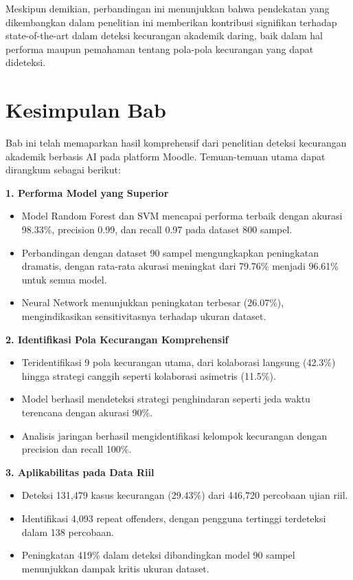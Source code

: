 Meskipun demikian, perbandingan ini menunjukkan bahwa pendekatan yang dikembangkan dalam penelitian ini memberikan kontribusi signifikan terhadap state-of-the-art dalam deteksi kecurangan akademik daring, baik dalam hal performa maupun pemahaman tentang pola-pola kecurangan yang dapat dideteksi.

\section{Kesimpulan Bab}
\label{sec:kesimpulanBab4}

Bab ini telah memaparkan hasil komprehensif dari penelitian deteksi kecurangan akademik berbasis AI pada platform Moodle. Temuan-temuan utama dapat dirangkum sebagai berikut:

\textbf{1. Performa Model yang Superior}
\begin{itemize}
    \item Model Random Forest dan SVM mencapai performa terbaik dengan akurasi 98.33\%, precision 0.99, dan recall 0.97 pada dataset 800 sampel.
    \item Perbandingan dengan dataset 90 sampel mengungkapkan peningkatan dramatis, dengan rata-rata akurasi meningkat dari 79.76\% menjadi 96.61\% untuk semua model.
    \item Neural Network menunjukkan peningkatan terbesar (26.07\%), mengindikasikan sensitivitasnya terhadap ukuran dataset.
\end{itemize}

\textbf{2. Identifikasi Pola Kecurangan Komprehensif}
\begin{itemize}
    \item Teridentifikasi 9 pola kecurangan utama, dari kolaborasi langsung (42.3\%) hingga strategi canggih seperti kolaborasi asimetris (11.5\%).
    \item Model berhasil mendeteksi strategi penghindaran seperti jeda waktu terencana dengan akurasi 90\%.
    \item Analisis jaringan berhasil mengidentifikasi kelompok kecurangan dengan precision dan recall 100\%.
\end{itemize}

\textbf{3. Aplikabilitas pada Data Riil}
\begin{itemize}
    \item Deteksi 131,479 kasus kecurangan (29.43\%) dari 446,720 percobaan ujian riil.
    \item Identifikasi 4,093 repeat offenders, dengan pengguna tertinggi terdeteksi dalam 138 percobaan.
    \item Peningkatan 419\% dalam deteksi dibandingkan model 90 sampel menunjukkan dampak kritis ukuran dataset.
\end{itemize}

